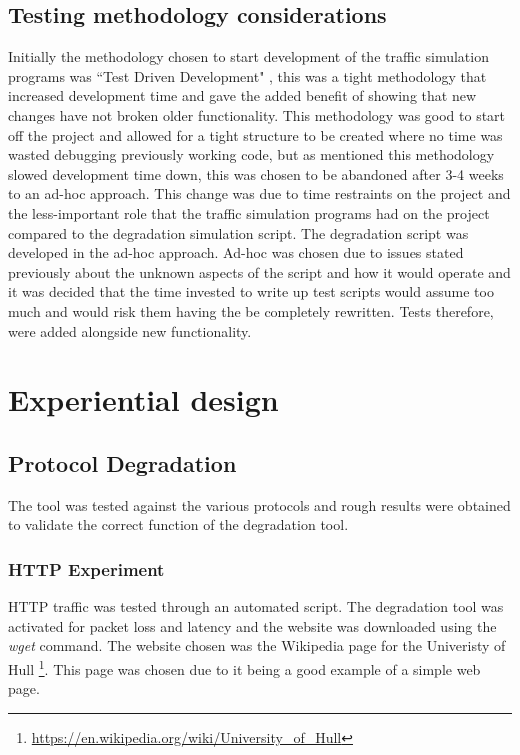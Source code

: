 \subsection{Testing methodology considerations}
Initially the methodology chosen to start development of the traffic simulation programs was ``Test Driven Development" \citep{beck2003test}, this was a tight methodology that increased development time and gave the added benefit of showing that new changes have not broken older functionality. This methodology was good to start off the project and allowed for a tight structure to be created where no time was wasted debugging previously working code, but as mentioned this methodology slowed development time down, this was chosen to be abandoned after 3-4 weeks to an ad-hoc approach. 
This change was due to time restraints on the project and the less-important role that the traffic simulation programs had on the project compared to the degradation simulation script. The degradation script was developed in the ad-hoc approach. Ad-hoc was chosen due to issues stated previously about the unknown aspects of the script and how it would operate and it was decided that the time invested to write up test scripts would assume too much and would risk them having the be completely rewritten. Tests therefore, were added alongside new functionality.





%
\section{Experiential design}

\subsection{Protocol Degradation}
The tool was tested against the various protocols and rough results were obtained to validate the correct function of the degradation tool. 

\subsubsection{HTTP Experiment}
HTTP traffic was tested through an automated script. The degradation tool was activated for packet loss and latency and the website was downloaded using the {\it wget} command. The website chosen was the Wikipedia page for the Univeristy of Hull \footnote{\url{https://en.wikipedia.org/wiki/University_of_Hull}}. This page was chosen due to it being a good example of a simple web page.

